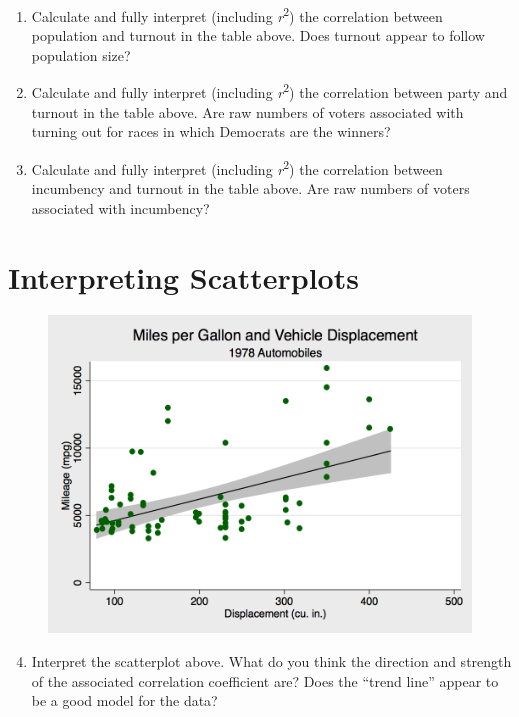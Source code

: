 \documentclass{tufte-handout}
\begin{document}
\begin{enumerate}
\item Calculate and fully interpret (including \textit{r}\textsuperscript{2}) the correlation between population and turnout in the table above. Does turnout appear to follow population size?
\item Calculate and fully interpret (including \textit{r}\textsuperscript{2}) the correlation between party and turnout in the table above. Are raw numbers of voters associated with turning out for races in which Democrats are the winners?
\item Calculate and fully interpret (including \textit{r}\textsuperscript{2}) the correlation between incumbency and turnout in the table above.  Are raw numbers of voters associated with incumbency?
\end{enumerate}

\vspace{5mm}
\section{Interpreting Scatterplots}
\begin{figure}[h]
\includegraphics[scale=.46]{fig11.png}
\end{figure}

\vspace{3mm}
\begin{enumerate}
\setcounter{enumi}{3}
\item Interpret the scatterplot above. What do you think the direction and strength of the associated correlation coefficient are? Does the ``trend line'' appear to be a good model for the data?
\end{enumerate}
\end{document}

